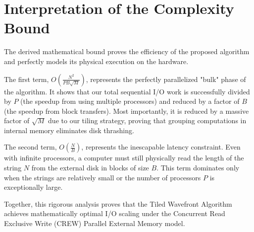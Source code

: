 \section{Interpretation of the Complexity Bound}
The derived mathematical bound proves the efficiency of the proposed algorithm and perfectly models its physical execution on the hardware. 

The first term, $O\left( \frac{N^2}{P B \sqrt{M}} \right)$, represents the perfectly parallelized "bulk" phase of the algorithm. It shows that our total sequential I/O work is successfully divided by $P$ (the speedup from using multiple processors) and reduced by a factor of $B$ (the speedup from block transfers). Most importantly, it is reduced by a massive factor of $\sqrt{M}$ due to our tiling strategy, proving that grouping computations in internal memory eliminates disk thrashing.

The second term, $O\left( \frac{N}{B} \right)$, represents the inescapable latency constraint. Even with infinite processors, a computer must still physically read the length of the string $N$ from the external disk in blocks of size $B$. This term dominates only when the strings are relatively small or the number of processors $P$ is exceptionally large. 

Together, this rigorous analysis proves that the Tiled Wavefront Algorithm achieves mathematically optimal I/O scaling under the Concurrent Read Exclusive Write (CREW) Parallel External Memory model.

